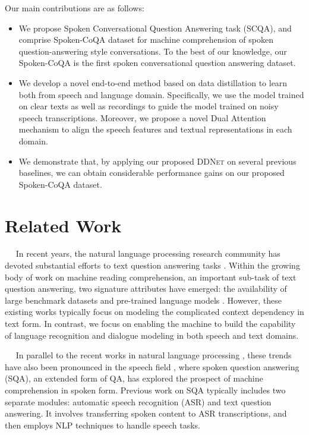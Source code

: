 \documentclass[11pt]{article}
\newcommand{\myparagraph}[1]{\vspace{2pt}\noindent{\bf{#1}}~~}
\begin{document}
Our main contributions are as follows:
\begin{itemize}
    \item We propose Spoken Conversational Question Answering task (SCQA), and comprise Spoken-CoQA dataset for machine comprehension of spoken question-answering style conversations. To the best of our knowledge, our Spoken-CoQA is the first spoken conversational question answering dataset.\vspace{-5pt}
    \item We develop a novel end-to-end method based on data distillation to learn both from speech and language domain. Specifically, we use the model trained on clear texts as well as recordings to guide the model trained on noisy speech transcriptions. Moreover, we propose a novel Dual Attention mechanism to align the speech features and textual representations in each domain.\vspace{-5pt}
    \item We demonstrate that, by applying our proposed \textsc{DDNet} on several previous baselines, we can obtain considerable performance gains on our proposed Spoken-CoQA dataset.
\end{itemize} 
\section{Related Work}
\myparagraph{Text Question Answering.}
In recent years, the natural language processing research community has devoted substantial efforts to text question answering tasks \cite{huang2018flowqa,zhu2018sdnet,xu2019review,zhang2019sgnet,gong2020recurrent,chen2020adaptive}. Within the growing body of work on machine reading comprehension, an important sub-task of text question answering, two signature attributes have emerged: the availability of large benchmark datasets \cite{choi2018quac, elgohary2018dataset,reddy2019coqa} and pre-trained language models \cite{devlin2018bert,liu2019roberta,lan2019albert}. However, these existing works typically focus on modeling the complicated context dependency in text form. In contrast, we focus on enabling the machine to build the capability of language recognition and dialogue modeling in both speech and text domains.

\myparagraph{Spoken Question Answering.}
In parallel to the recent works in natural language processing \cite{huang2018flowqa,zhu2018sdnet}, these trends have also been pronounced in the speech field \cite{chen2018spoken,haghani2018audio,lugosch2019speech,palogiannidi2020end,you2020contextualized,you2021knowledge,you2021mrd,you2021self,you2020data,chen2021self,xu2021semantic,su2020audeo,su2021does}, where spoken question answering (SQA), an extended form of QA, has explored the prospect of machine comprehension in spoken form. Previous work on SQA typically includes two separate modules: automatic speech recognition (ASR) and text question answering. It involves transferring spoken content to ASR transcriptions, and then employs NLP techniques to handle speech tasks. 
\end{document}
